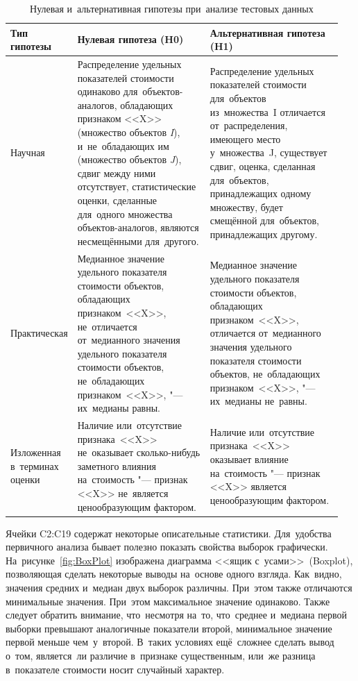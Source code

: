 \documentclass[]{scrreprt}
\begin{document}
\begin{table}[ht]
	\caption{Нулевая и~альтернативная гипотезы при~анализе тестовых данных}  \label{tab:nul-alt-hypothesis-variants}
	\centering
	\begin{tabularx}{\textwidth}{p{0.15\linewidth} p{0.4\linewidth} p{0.4\linewidth}} 
		\hline
		Тип гипотезы&Нулевая гипотеза (H0)&Альтернативная гипотеза (H1)\\
		\hline
		Научная&Распределение удельных показателей стоимости одинаково для~объектов-аналогов, обладающих признаком <<X>> (множество объектов \textit{I}), и~не~обладающих им (множество объектов \textit{J}), сдвиг между ними отсутствует, статистические оценки, сделанные для~одного множества объектов-аналогов, являются несмещёнными для~другого.&Распределение удельных показателей стоимости для~объектов из~множества~I отличается от~распределения, имеющего место у~множества~J, существует сдвиг, оценка, сделанная для~объектов, принадлежащих одному множеству, будет смещённой для~объектов, принадлежащих другому.\\
		\hline
		Практическая&Медианное значение удельного показателя стоимости объектов, обладающих признаком~<<X>>, не~отличается от~медианного значения удельного показателя стоимости объектов, не~обладающих признаком~<<X>>, "--- их~медианы равны.&Медианное значение удельного показателя стоимости объектов, обладающих признаком~<<X>>, отличается от~медианного значения удельного показателя стоимости объектов, не~обладающих признаком~<<X>>, "--- их~медианы не~равны.\\
		\hline
		Изложенная в~терминах оценки&Наличие или~отсутствие признака~<<X>> не~оказывает сколько-нибудь заметного влияния на~стоимость "--- признак <<X>> не~является ценообразующим фактором.&Наличие или~отсутствие признака~<<X>> оказывает влияние на~стоимость "--- признак <<X>> является ценообразующим фактором.\\ \hline
	\end{tabularx}
\end{table}
Ячейки C2:C19 содержат некоторые описательные статистики.  Для~удобства первичного анализа бывает полезно показать свойства выборок графически. На~рисунке~\ref{fig:BoxPlot} изображена диаграмма <<ящик с~усами>>~(\foreignlanguage{english}{Boxplot}), позволяющая сделать некоторые выводы на~основе одного взгляда. Как~видно, значения средних и~медиан двух выборок различны. При~этом также отличаются минимальные значения. При~этом максимальное значение одинаково. Также следует обратить внимание, что~несмотря на~то, что~среднее и~медиана первой выборки превышают аналогичные показатели второй, минимальное значение первой меньше чем~у~второй. В~таких условиях ещё~сложнее сделать вывод о~том, является~ли различие в~признаке существенным, или~же разница в~показателе стоимости носит случайный характер.
\end{document}
